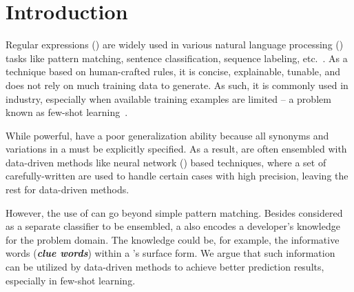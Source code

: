 \section{Introduction}


Regular expressions (\REs) are widely used in various natural language processing (\NLP) tasks like pattern matching, sentence
classification, sequence labeling, etc.~\cite{chang2014tokensregex}.
As a technique based on human-crafted rules, it is concise, explainable, tunable, and does not rely on much training data to generate. As
such, it is commonly used in industry, especially when available training examples are limited -- a problem known as few-shot
learning~\cite{gc2015big}.

While powerful, \REs have a poor generalization ability because all synonyms and variations in a \RE must be explicitly specified. As a
result, %
\REs are often ensembled  with data-driven methods like neural network (\NN) based techniques, where a set of carefully-written \REs are
used to handle certain cases with high precision, leaving the rest for data-driven methods.

However, the use of \REs can go beyond simple pattern matching.
Besides considered as a separate classifier to be ensembled,
a \RE also encodes a developer's knowledge for the problem domain. The knowledge could be, for example,  the informative words
(\textbf{\textit{clue
words}}) within a \RE's surface form. %
We argue that such information can be utilized by data-driven methods to achieve better prediction results, especially in
few-shot learning.




